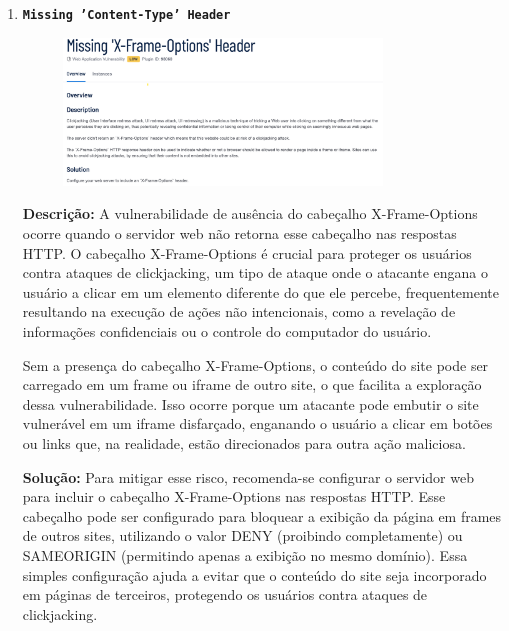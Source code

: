 \documentclass[a4paper,12pt]{article}
\begin{document}
\begin{enumerate}
\item \textbf{\texttt{Missing 'Content-Type' Header}}

                        \begin{figure}[h!]
                        \centering
                        \includegraphics[width=0.8\textwidth]{assets/images-was/Vulnerabilidades Relacionadas a Configurações de Segurança HTTP E TLS/Missing 'X-Frame-Options' Header.png}
                        \end{figure}
                        \FloatBarrier
                        \textbf{Descrição:} A vulnerabilidade de ausência do cabeçalho X-Frame-Options ocorre quando o servidor web não retorna esse cabeçalho nas respostas HTTP. O cabeçalho X-Frame-Options é crucial para proteger os usuários contra ataques de clickjacking, um tipo de ataque onde o atacante engana o usuário a clicar em um elemento diferente do que ele percebe, frequentemente resultando na execução de ações não intencionais, como a revelação de informações confidenciais ou o controle do computador do usuário.

    Sem a presença do cabeçalho X-Frame-Options, o conteúdo do site pode ser carregado em um frame ou iframe de outro site, o que facilita a exploração dessa vulnerabilidade. Isso ocorre porque um atacante pode embutir o site vulnerável em um iframe disfarçado, enganando o usuário a clicar em botões ou links que, na realidade, estão direcionados para outra ação maliciosa.

\textbf{Solução:} Para mitigar esse risco, recomenda-se configurar o servidor web para incluir o cabeçalho X-Frame-Options nas respostas HTTP. Esse cabeçalho pode ser configurado para bloquear a exibição da página em frames de outros sites, utilizando o valor DENY (proibindo completamente) ou SAMEORIGIN (permitindo apenas a exibição no mesmo domínio). Essa simples configuração ajuda a evitar que o conteúdo do site seja incorporado em páginas de terceiros, protegendo os usuários contra ataques de clickjacking.


\end{enumerate}
\end{document}
